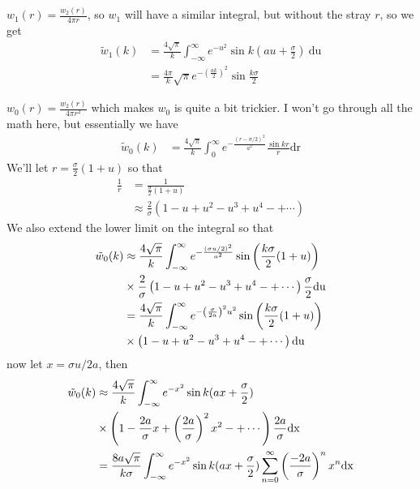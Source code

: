 \documentclass[letterpaper,twocolumn,amsmath,amssymb,prb]{revtex4-1}
\newcommand{\red}[1]{{\color{red} #1}}
\newcommand{\fixme}[1]{\red{[#1]}}
\begin{document}
$w_1(r) = \frac{w_2(r)}{4\pi r}$, so $w_1$ will have a similar
integral, but without the stray $r$, so we get
\begin{align}
  \tilde{w}_1(k)&= \frac{4\sqrt{\pi}}{k} \int_{-\infty}^\infty e^{-u^2} \sin{k\left(au +
  \frac{\sigma}{2}\right)} ~\textrm{du} \\
  &= \frac{4\pi}{k}\sqrt{\pi}e^{-\left(\frac{ak}{2} \right)^2} \sin{\frac{k\sigma}{2}}
\end{align}

$w_0(r) = \frac{w_2(r)}{4\pi r^2}$ which makes $w_0$ is quite a bit
trickier.  I won't go through all the math here, but essentially we
have
\begin{align}
  \tilde{w}_0(k) &= \frac{4\sqrt{\pi}}{k}\int_0^\infty
  e^{-\frac{(r-\sigma/2)^2}{a^2}} \frac{\sin{kr}}{r}\textrm{dr}
\end{align}
We'll let $r = \frac{\sigma}{2}(1 + u) $ so that
\begin{align}
  \frac{1}{r} &= \frac{1}{\frac{\sigma}{2}(1 + u)} \\
  &\approx \frac{2}{\sigma}\left(1 - u + u^2 - u^3 + u^4 -+\cdots \right)
\end{align}
We also extend the lower limit on the integral so that
\begin{align}
  \tilde{w}_0(k) &\approx \frac{4\sqrt{\pi}}{k}\int_{-\infty}^\infty
  e^{-\frac{(\sigma u/2)^2}{a^2}} \sin{\left( \frac{k\sigma}{2}(1+u)
    \right)} \notag\\
  &\times \frac{2}{\sigma} \left(1 - u + u^2 - u^3 + u^4 -+\cdots
  \right) \frac{\sigma}{2}\textrm{du} \\
  &= \frac{4\sqrt{\pi}}{k}\int_{-\infty}^\infty
  e^{-\left(\frac{\sigma}{2a} \right)^2 u^2} \sin{\left( \frac{k\sigma}{2}(1+u)
    \right)} \notag\\
  &\times \left(1 - u + u^2 - u^3 + u^4 -+\cdots \right) \textrm{du}
\end{align}
now let $x = \sigma u /2a$, then
\begin{align}
  \tilde{w}_0(k) &\approx \frac{4\sqrt{\pi}}{k}\int_{-\infty}^\infty
  e^{-x^2} \sin{k(ax+\frac{\sigma}{2})} \notag\\
  &\times \left(1 - \frac{2a}{\sigma}x +
  \left(\frac{2a}{\sigma}\right)^2 x^2 -+\cdots \right) \frac{2a}{\sigma}\textrm{dx} \\
  &= \frac{8a\sqrt{\pi}}{k\sigma}\int_{-\infty}^\infty
  e^{-x^2} \sin{k(ax+\frac{\sigma}{2})}
  \sum_{n=0}^{\infty} \left(\frac{-2a}{\sigma}\right)^n x^n \textrm{dx}
\end{align}
\end{document}
